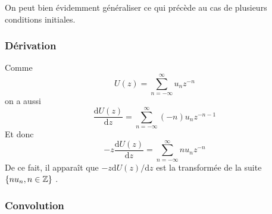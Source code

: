 On peut bien \'{e}videmment g\'{e}n\'{e}raliser ce qui pr\'{e}c\`{e}de au cas de plusieurs conditions initiales.

%
%
%
%
%
%
%
\subsubsection{D\'{e}rivation}
Comme
$$
U(z)=\sum_{n=-\infty}^{\infty}u_{n}z^{-n}
$$
on a aussi
$$
\frac{\mathrm{d}U(z)}{\mathrm{d}z}=\sum_{n=-\infty}^{\infty}(-n)u_{n}z^{-n-1}
$$
Et donc
$$
-z\frac{\mathrm{d}U(z)}{\mathrm{d}z}=\sum_{n=-\infty}^{\infty}nu_{n}z^{-n}
$$
De ce fait, il appara\^{i}t que $-z\mathrm{d}U(z)/\mathrm{d}z$ est la transform\'{e}e de la suite $\{nu_{n}, n \in \mathbb{Z}\}$ .
%
\subsubsection{Convolution}

